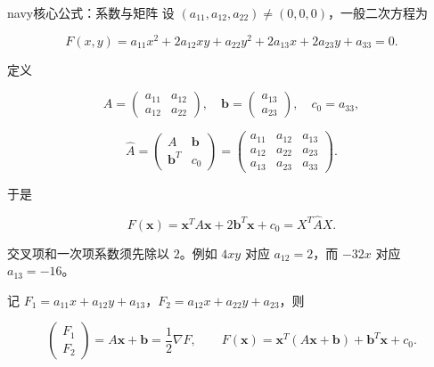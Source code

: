 \documentclass[11pt,a4paper]{article}
\begin{document}
\begin{sboxenv}{navy}{核心公式：系数与矩阵}
设 \((a_{11},a_{12},a_{22})\ne(0,0,0)\)，一般二次方程为

\begin{equation*}
F(x,y)=a_{11}x^2+2a_{12}xy+a_{22}y^2+2a_{13}x+2a_{23}y+a_{33}=0.
\end{equation*}

定义

\begin{equation*}
A=\begin{pmatrix}a_{11}&a_{12}\\a_{12}&a_{22}\end{pmatrix},\quad \boldsymbol b=\begin{pmatrix}a_{13}\\a_{23}\end{pmatrix},\quad c_0=a_{33},
\end{equation*}

\begin{equation*}
\widehat A=\begin{pmatrix}A&\boldsymbol b\\\boldsymbol b^T&c_0\end{pmatrix}=\begin{pmatrix}a_{11}&a_{12}&a_{13}\\a_{12}&a_{22}&a_{23}\\a_{13}&a_{23}&a_{33}\end{pmatrix}.
\end{equation*}

于是

\begin{equation*}
F(\boldsymbol x)=\boldsymbol x^TA\boldsymbol x+2\boldsymbol b^T\boldsymbol x+c_0=X^T\widehat AX.\tag{1.1}
\end{equation*}

\end{sboxenv}

交叉项和一次项系数须先除以 \(2\)。例如 \(4xy\) 对应 \(a_{12}=2\)，而
\(-32x\) 对应 \(a_{13}=-16\)。

记 \(F_1=a_{11}x+a_{12}y+a_{13}\)，\(F_2=a_{12}x+a_{22}y+a_{23}\)，则

\begin{equation*}
\begin{pmatrix}F_1\\F_2\end{pmatrix}=A\boldsymbol x+\boldsymbol b=\frac12\nabla F,\qquad F(\boldsymbol x)=\boldsymbol x^T(A\boldsymbol x+\boldsymbol b)+\boldsymbol b^T\boldsymbol x+c_0.\tag{1.2}
\end{equation*}
\end{document}
